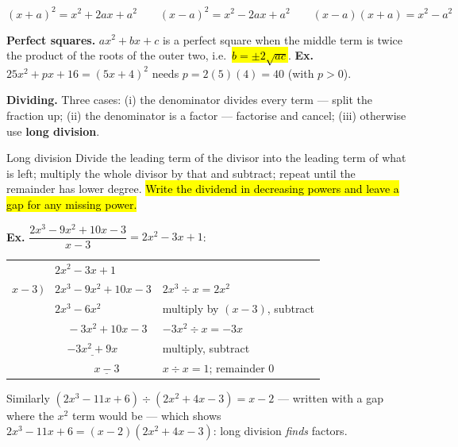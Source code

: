 \documentclass[11pt]{article}
\newcommand{\key}[1]{\hl{#1}}
\newcommand{\wex}[1]{{\color{lilacdeep}\textbf{Ex.}} #1}
\begin{document}
\begin{formulabox}
\[(x+a)^{2}=x^{2}+2ax+a^{2}\qquad (x-a)^{2}=x^{2}-2ax+a^{2}\qquad (x-a)(x+a)=x^{2}-a^{2}\]
\end{formulabox}

\textbf{Perfect squares.} $ax^{2}+bx+c$ is a perfect square when the middle term is twice the product of the roots of the outer two, i.e.\ \key{\mbox{$b=\pm2\sqrt{ac}$}}. \wex{$25x^{2}+px+16=(5x+4)^{2}$ needs $p=2(5)(4)=40$ (with $p>0$).}

\textbf{Dividing.} Three cases: (i) the denominator divides every term --- split the fraction up; (ii) the denominator is a factor --- factorise and cancel; (iii) otherwise use \textbf{long division}.

\begin{methodbox}{Long division}
Divide the leading term of the divisor into the leading term of what is left; multiply the whole divisor by that and subtract; repeat until the remainder has lower degree. \key{Write the dividend in decreasing powers and leave a gap for any missing power.}
\end{methodbox}

\wex{$\dfrac{2x^{3}-9x^{2}+10x-3}{x-3}=2x^{2}-3x+1$:}

\vspace{-0.4em}
\begin{center}
\begin{tabular}{@{}r@{\ }l@{\qquad}l@{}}
& \underline{$2x^{2}-3x+1$} & \\
$x-3\,\big)$ & $2x^{3}-9x^{2}+10x-3$ & \small\color{greyish}$2x^{3}\div x=2x^{2}$\\
& \underline{$2x^{3}-6x^{2}$}\hspace{2.5cm} & \small\color{greyish}multiply by $(x-3)$, subtract\\
& $\ \ \ \ \ -3x^{2}+10x-3$ & \small\color{greyish}$-3x^{2}\div x=-3x$\\
& $\ \ \ \ \ \underline{-3x^{2}+9x}$\hspace{1.2cm} & \small\color{greyish}multiply, subtract\\
& $\ \ \ \ \ \ \ \ \ \ \ \ \ \ \ \ \underline{x-3}$ & \small\color{greyish}$x\div x=1$; remainder $0$\\
\end{tabular}
\end{center}
\vspace{-0.35em}

Similarly $(2x^{3}-11x+6)\div(2x^{2}+4x-3)=x-2$ --- written with a gap where the $x^{2}$ term would be --- which shows $2x^{3}-11x+6=(x-2)(2x^{2}+4x-3)$: long division \emph{finds} factors.
\end{document}
